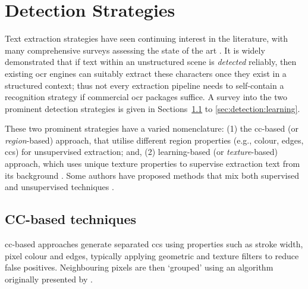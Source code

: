 \section{Detection Strategies}
\label{sec:background:detection_strategies}

Text extraction strategies have seen continuing interest in the literature, with many comprehensive surveys assessing the state of the art \cite{Chen:2000ua, Jung:2004uwa, Zhang:2008vfa, Liang:2005uy, Jung:2004uw}. It is widely demonstrated that if text within an unstructured scene is \textit{detected} reliably, then existing \gls{ocr} engines can suitably extract these characters \citep{Smith:2007dc} once they exist in a structured context; thus not every extraction pipeline needs to self-contain a recognition strategy if commercial \gls{ocr} packages suffice. A survey into the two prominent detection strategies is given in Sections~\ref{sec:detection:cc} to \ref{sec:detection:learning}.

These two prominent strategies have a varied nomenclature: (1) the \gls{cc}-based (or \textit{region}-based) approach, that utilise different region properties (e.g., colour, edges, \glspl{cc}) \citep{Jain:1998wd, Kim:1996tw, Liu:2006wh, Chen:2011ul, Li:2012wd, Zhang:2011cl, Shivakumara:2011dn, Epshtein:2010tj, Zhang:2010wa, Shivakumara:2010wu, Liu:2008tz, Subramanian:2007tf, Lee:2010vv, Sun:2010tg} for unsupervised extraction; and, (2) learning-based (or \textit{texture}-based) approach, which uses unique texture properties to supervise extraction text from its background \citep{Ye:2005wu,XiangrongChen:2004ha,Pan:2010cj,Gllavata:2004vq,Minetto:2010tg,Phan:2009bc,Lee:2003cn,Lienhart:2002ub,Li:2000uf,Wang:2009il,Dalal:2005jq,Hanif:2009tm,Tu:2003tg,Chen:2005wv}. Some authors have proposed methods that mix both supervised and unsupervised techniques \citep{Mutch:2006ub, Mairal:2008uw, Bengio:2006vb}.

\subsection{CC-based techniques}
\label{sec:detection:cc}

\gls{cc}-based approaches generate separated \glspl{cc} using properties such as stroke width, pixel colour and edges, typically applying geometric and texture filters to reduce false positives. Neighbouring pixels are then `grouped' using an algorithm originally presented by \citet{Horn:1986vc}. 

